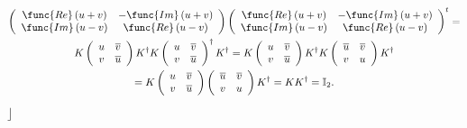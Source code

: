 \documentclass[aps,preprint]{revtex4}
\begin{document}
\begin{gather}
\left( 
\begin{array}{cc}
\func{Re}\left( u+v\right) & -\func{Im}\left( u+v\right) \\ 
\func{Im}\left( u-v\right) & \func{Re}\left( u-v\right)%
\end{array}%
\right) \left( 
\begin{array}{cc}
\func{Re}\left( u+v\right) & -\func{Im}\left( u+v\right) \\ 
\func{Im}\left( u-v\right) & \func{Re}\left( u-v\right)%
\end{array}%
\right) ^{t}= \\
K\left( 
\begin{array}{cc}
u & \overline{v} \\ 
v & \overline{u}%
\end{array}%
\right) K^{\dagger }K\left( 
\begin{array}{cc}
u & \overline{v} \\ 
v & \overline{u}%
\end{array}%
\right) ^{\dagger }K^{\dagger }=K\left( 
\begin{array}{cc}
u & \overline{v} \\ 
v & \overline{u}%
\end{array}%
\right) K^{\dagger }K\left( 
\begin{array}{cc}
\overline{u} & \overline{v} \\ 
v & u%
\end{array}%
\right) K^{\dagger } \\
=K\left( 
\begin{array}{cc}
u & \overline{v} \\ 
v & \overline{u}%
\end{array}%
\right) \left( 
\begin{array}{cc}
\overline{u} & \overline{v} \\ 
v & u%
\end{array}%
\right) K^{\dagger }=KK^{\dagger }=\mathbb{I}_{2}.
\end{gather}%
$\rfloor $
\end{document}
